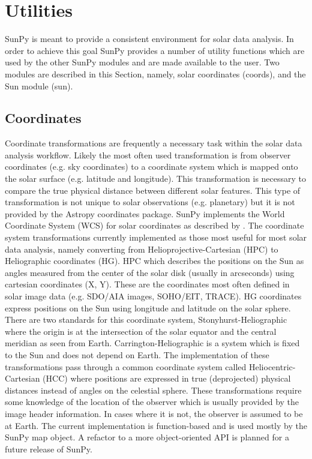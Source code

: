 \section{Utilities}
SunPy is meant to provide a consistent environment for solar data analysis. In order to
achieve this goal SunPy provides a number of utility functions which are used by the other
SunPy modules and are made available to the user. Two modules are described in this Section, 
namely, solar coordinates (coords), and the Sun module (sun). 
	
\subsection{Coordinates}
Coordinate transformations are frequently a necessary task within the solar data analysis
workflow. Likely the most often used transformation is from observer coordinates (e.g. 
sky coordinates) to a coordinate system which is mapped onto the solar surface (e.g.
latitude and longitude). This transformation is necessary to compare the true physical
distance between different solar features. This type of transformation is not unique
to solar observations (e.g. planetary) but it is not provided by the Astropy coordinates 
package. SunPy implements the World Coordinate System (WCS) for solar
coordinates as described by \cite{Thompson2000}. The coordinate system transformations
currently implemented as those most useful for most solar data analysis, namely 
converting from Helioprojective-Cartesian (HPC) to Heliographic coordinates (HG). HPC 
which describes the positions on the Sun as angles measured from the center of the solar 
disk (usually in arcseconds) using cartesian coordinates (X, Y). These are the coordinates 
most often defined in solar image data (e.g. SDO/AIA images, SOHO/EIT, TRACE). HG
coordinates express positions on the Sun using longitude and latitude on the solar 
sphere. There are two standards for this coordinate system, Stonyhurst-Heliographic 
where the origin is at the intersection of the solar equator and 
the central meridian as seen from Earth. Carrington-Heliographic is a system which is
fixed to the Sun and does not depend on Earth. The implementation of these transformations
pass through a common coordinate system called Heliocentric-Cartesian (HCC) where positions 
are expressed in true (deprojected) physical distances instead of angles on the celestial sphere.
These transformations require some knowledge of the location of the observer which is
usually provided by the image header information. In cases where it is not, the observer
is assumed to be at Earth. The current implementation is function-based and is used mostly
by the SunPy map object. A refactor to a more object-oriented API is planned for a future
release of SunPy.


